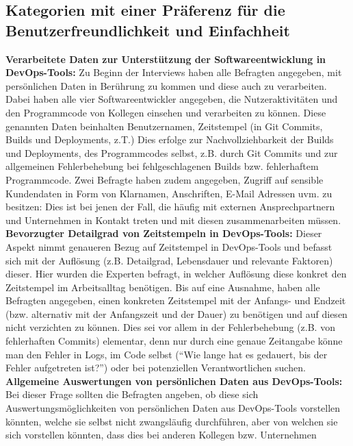 \subsection{Kategorien mit einer Präferenz für die Benutzerfreundlichkeit und Einfachheit} \label{noprivacy}
\textbf{Verarbeitete Daten zur Unterstützung der Softwareentwicklung in DevOps-Tools:} \newline
Zu Beginn der Interviews haben alle Befragten angegeben, mit persönlichen Daten in Berührung zu kommen und diese auch zu verarbeiten. Dabei haben alle vier Softwareentwickler angegeben, die Nutzeraktivitäten und den Programmcode von Kollegen 
einsehen und verarbeiten zu können. Diese genannten Daten beinhalten Benutzernamen, Zeitstempel (in Git Commits, Builds und Deployments, z.T.)
Dies erfolge zur Nachvollziehbarkeit der Builds und Deployments, des Programmcodes selbst, z.B. durch Git Commits und zur allgemeinen Fehlerbehebung bei fehlgeschlagenen Builds bzw. fehlerhaftem Programmcode. 
Zwei Befragte haben zudem angegeben, Zugriff auf sensible Kundendaten in Form von Klarnamen, Anschriften, E-Mail Adressen uvm. zu besitzen: Dies ist bei jenen der Fall, die häufig mit externen Ansprechpartnern und Unternehmen in Kontakt treten 
und mit diesen zusammenarbeiten müssen. \newline \newline
\textbf{Bevorzugter Detailgrad von Zeitstempeln in DevOps-Tools:} \newline
Dieser Aspekt nimmt genaueren Bezug auf Zeitstempel in DevOps-Tools und befasst sich mit der Auflösung (z.B. Detailgrad, Lebensdauer und relevante Faktoren) dieser. Hier wurden die Experten befragt, in welcher Auflösung diese konkret den Zeitstempel 
im Arbeitsalltag benötigen. Bis auf eine Ausnahme, haben alle Befragten angegeben, einen konkreten Zeitstempel mit der Anfangs- und Endzeit (bzw. alternativ mit der Anfangszeit und der Dauer) zu benötigen und auf diesen nicht verzichten zu können. Dies sei
vor allem in der Fehlerbehebung (z.B. von fehlerhaften Commits) elementar, denn nur durch eine genaue Zeitangabe könne man den Fehler in Logs, im Code selbst (\enquote{Wie lange hat es gedauert, bis der Fehler aufgetreten ist?}) oder bei potenziellen Verantwortlichen 
suchen. \newline \newline
\textbf{Allgemeine Auswertungen von persönlichen Daten aus DevOps-Tools:} \newline
Bei dieser Frage sollten die Befragten angeben, ob diese sich Auswertungsmöglichkeiten von persönlichen Daten aus DevOps-Tools vorstellen könnten, welche sie selbst nicht zwangsläufig durchführen, aber von welchen sie sich vorstellen könnten, dass dies bei anderen Kollegen bzw. Unternehmen
